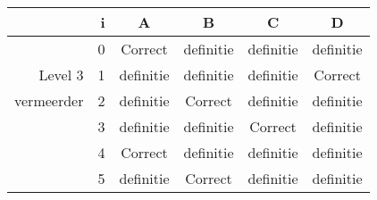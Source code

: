 \begin{tabular}{ rr| c|c|c|c}\hline\hline
     & i & \textbf{A} & \textbf{B} & \textbf{C} & \textbf{D}\\\hline

&0&Correct\cellcolor[gray]{0.6}&definitie&definitie&definitie\\
Level 3 & 1&definitie&definitie&definitie&Correct\cellcolor[gray]{0.6}\\
vermeerder &2&definitie&Correct\cellcolor[gray]{0.6}&definitie&definitie\\
&3&definitie&definitie&Correct\cellcolor[gray]{0.6}&definitie\\
&4&Correct\cellcolor[gray]{0.6}&definitie&definitie&definitie\\
&5&definitie&Correct\cellcolor[gray]{0.6}&definitie&definitie\\
\hline\end{tabular}\par\ \newline

